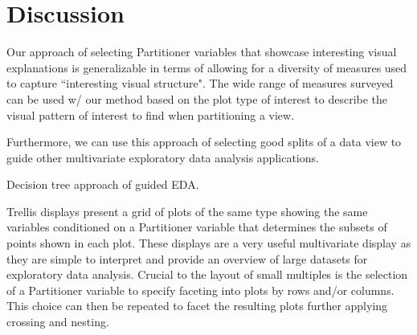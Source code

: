 \section{Discussion}
\label{sec:discussion}
Our approach of selecting Partitioner variables that showcase interesting visual explanations is generalizable in terms of allowing for a diversity of measures used to capture ``interesting visual structure". The wide range of measures surveyed~\cite{Bertini2011} can be used w/ our method based on the plot type of interest to describe the visual pattern of interest to find when partitioning a view.

Furthermore, we can use this approach of selecting good splits of a data view to guide other multivariate exploratory data analysis applications.

Decision tree approach of guided EDA.

Trellis displays present a grid of plots of the same type showing the same variables conditioned on a Partitioner variable that determines the subsets of points shown in each plot. These displays are a very useful multivariate display as they are simple to interpret and provide an overview of large datasets for exploratory data analysis. Crucial to the layout of small multiples is the selection of a Partitioner variable to specify faceting into plots by rows and/or columns. This choice can then be repeated to facet the resulting plots further applying crossing and nesting.


